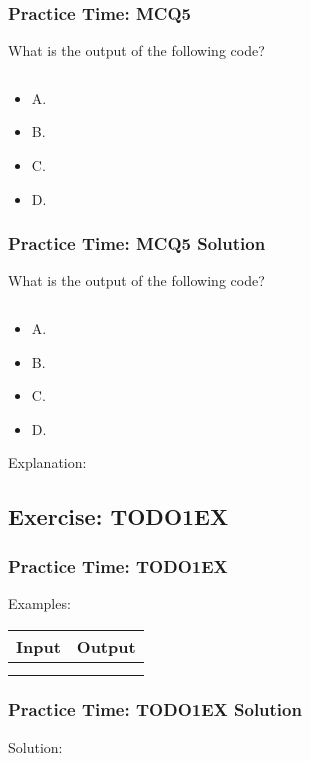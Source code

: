 \documentclass{beamer}
\begin{document}
\begin{frame}[fragile]
    \frametitle{Practice Time: MCQ5}
    What is the output of the following code?
    \begin{verbatim}
    \end{verbatim}
    \begin{itemize}
        \item A.
        \item B.
        \item C.
        \item D.
    \end{itemize}
\end{frame}
\begin{frame}[fragile]
    \frametitle{Practice Time: MCQ5 Solution}
    What is the output of the following code?
    \begin{verbatim}
    \end{verbatim}
    \begin{itemize}
        \item A.
        \item B.
        \item C.
        \item D.
    \end{itemize}

    Explanation:
\end{frame}

\subsection{Exercise: TODO1EX}
\begin{frame}[fragile]
    \frametitle{Practice Time: TODO1EX}


    Examples:

    \begin{center}
        \begin{tabular}{|c|c|}
            \hline
            Input & Output  \\ \hline
                  &         \\ \hline
                  &         \\ \hline
        \end{tabular}
\end{center}
\end{frame}
\begin{frame}[fragile]
    \frametitle{Practice Time: TODO1EX Solution}

    Solution:
    \begin{verbatim}
    \end{verbatim}
\end{frame}
\end{document}
